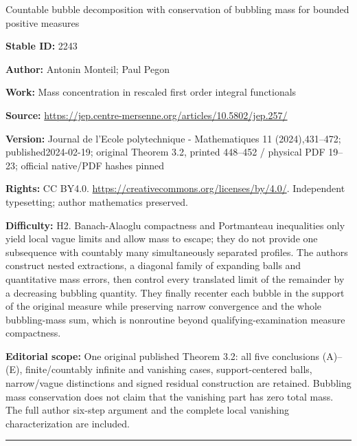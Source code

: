 \documentclass[11pt]{article}
\theoremstyle{plain}
\theoremstyle{definition}
\numberwithin{equation}{section}
\begin{document}
\begin{center}\Large Countable bubble decomposition with conservation of bubbling mass for bounded positive measures\end{center}
\noindent\textbf{Stable ID:} 2243\par
\noindent\textbf{Author:} Antonin Monteil; Paul Pegon\par
\noindent\textbf{Work:} Mass concentration in rescaled first order integral functionals\par
\noindent\textbf{Source:} \url{https://jep.centre-mersenne.org/articles/10.5802/jep.257/}\par
\noindent\textbf{Version:} Journal de l'Ecole polytechnique - Mathematiques 11 (2024),431--472; published2024-02-19; original Theorem 3.2, printed 448--452 / physical PDF 19--23; official native/PDF hashes pinned\par
\noindent\textbf{Rights:} CC BY4.0. \url{https://creativecommons.org/licenses/by/4.0/}. Independent typesetting; author mathematics preserved.\par
\noindent\textbf{Difficulty:} H2. Banach-Alaoglu compactness and Portmanteau inequalities only yield local vague limits and allow mass to escape; they do not provide one subsequence with countably many simultaneously separated profiles. The authors construct nested extractions, a diagonal family of expanding balls and quantitative mass errors, then control every translated limit of the remainder by a decreasing bubbling quantity. They finally recenter each bubble in the support of the original measure while preserving narrow convergence and the whole bubbling-mass sum, which is nonroutine beyond qualifying-examination measure compactness.\par
\noindent\textbf{Editorial scope:} One original published Theorem 3.2: all five conclusions (A)--(E), finite/countably infinite and vanishing cases, support-centered balls, narrow/vague distinctions and signed residual construction are retained. Bubbling mass conservation does not claim that the vanishing part has zero total mass. The full author six-step argument and the complete local vanishing characterization are included.\par
\medskip\hrule\medskip
\end{document}
